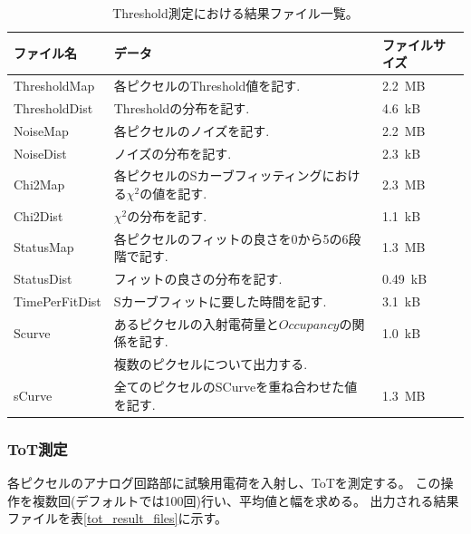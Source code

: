 \begin{table}[tbp]
\begin{center}
\caption[Threshold測定における結果ファイル一覧]{Threshold測定における結果ファイル一覧。}
\label{threshold_result_files}
  \small
  \begin{tabular}{|lll|} \hline
    ファイル名 & データ & ファイルサイズ \\ \hline
    ThresholdMap   & 各ピクセルのThreshold値を記す.                                                         & 2.2~MB \\
    ThresholdDist  & Thresholdの分布を記す.                                                                 & 4.6~kB \\ 
    NoiseMap       & 各ピクセルのノイズを記す.                                                              & 2.2~MB \\ 
    NoiseDist      & ノイズの分布を記す.                                                                    & 2.3~kB \\ 
    Chi2Map        & 各ピクセルのSカーブフィッティングにおける$\chi^2$の値を記す.                           & 2.3~MB \\ 
    Chi2Dist       & $\chi^2$の分布を記す.                                                                  & 1.1~kB \\ 
    StatusMap      & 各ピクセルのフィットの良さを0から5の6段階で記す.                                       & 1.3~MB \\ 
    StatusDist     & フィットの良さの分布を記す.                                                            & 0.49~kB \\ 
    TimePerFitDist & Sカーブフィットに要した時間を記す.                                                     & 3.1~kB \\ 
    Scurve         & あるピクセルの入射電荷量と$Occupancy$の関係を記す.                                     & 1.0~kB \\ 
                   & 複数のピクセルについて出力する.                                                        &        \\ 
    sCurve         & 全てのピクセルのSCurveを重ね合わせた値を記す.                                          & 1.3~MB \\ \hline 
  \end{tabular}
\end{center}
\end{table}

\subsubsection{ToT測定}
各ピクセルのアナログ回路部に試験用電荷を入射し、ToTを測定する。
この操作を複数回(デフォルトでは100回)行い、平均値と幅を求める。
出力される結果ファイルを表\ref{tot_result_files}に示す。

